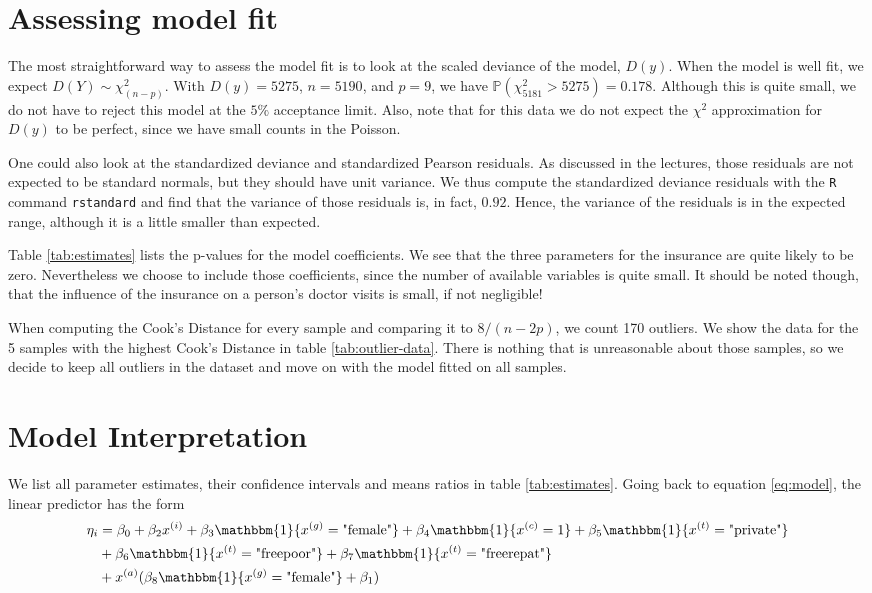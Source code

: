 \documentclass[a4paper,11pt]{article}
\begin{document}
\section{Assessing model fit}
The most straightforward way to assess the model fit is to look at the scaled deviance of the model, $D(y)$. When the model is well fit, we expect $D(Y) \sim \chi^2_{(n-p)}$. With $D(y) = 5275$, $n = 5190$, and $p=9$, we have $\mathbb{P}( \chi^2_{5181} > 5275) = 0.178$. Although this is quite small, we do not have to reject this model at the $5\%$ acceptance limit. Also, note that for this data we do not expect the $\chi^2$ approximation for $D(y)$ to be perfect, since we have small counts in the Poisson.

One could also look at the standardized deviance and standardized Pearson residuals. As discussed in the lectures, those residuals are not expected to be standard normals, but they should have unit variance. We thus compute the standardized deviance residuals with the \texttt{R} command \texttt{rstandard} and find that the variance of those residuals is, in fact, $0.92$. Hence, the variance of the residuals is in the expected range, although it is a little smaller than expected.

Table \ref{tab:estimates} lists the p-values for the model coefficients. We see that the three parameters for the insurance are quite likely to be zero. Nevertheless we choose to include those coefficients, since the number of available variables is quite small. It should be noted though, that the influence of the insurance on a person's doctor visits is small, if not negligible!


When computing the Cook's Distance for every sample and comparing it to $8/(n-2p)$, we count 170 outliers. We show the data for the 5 samples with the highest Cook's Distance in table \ref{tab:outlier-data}. There is nothing that is unreasonable about those samples, so we decide to keep all outliers in the dataset and move on with the model fitted on all samples.

\section{Model Interpretation}

We list all parameter estimates, their confidence intervals and means ratios in table \ref{tab:estimates}. Going back to equation \ref{eq:model}, the linear predictor has the form
\begin{align}
\eta_i &= \beta_0  +  \beta_2 x^{(i)} + \beta_3 \mathbbm{1}\{x^{(g)} = \text{"female"}\}     +\beta_4\mathbbm{1}\{x^{(c)} = 1\}   + 
 \beta_5\mathbbm{1}\{x^{(t)} = \text{"private"}\}    \nonumber\\
 &+  \beta_6\mathbbm{1}\{x^{(t)} = \text{"freepoor"}\}  + \beta_7 \mathbbm{1}\{x^{(t)} = \text{"freerepat"}\}  \\
&+   x^{(a)}(\beta_8 \mathbbm{1}\{x^{(g)} = \text{"female"} \} + \beta_1) \nonumber
\end{align}
\end{document}

